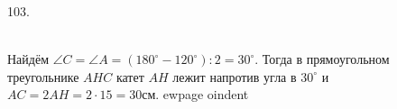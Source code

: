 103. \begin{figure}[ht!]
\end{figure}\\
Найдём $\angle C=\angle A=(180^\circ-120^\circ):2=30^\circ.$ Тогда в прямоугольном треугольнике $AHC$ катет $AH$ лежит напротив угла в $30^\circ$ и $AC=2AH=2\cdot15=30$см.
ewpage
oindent
